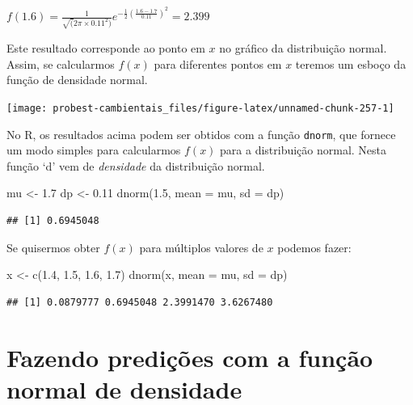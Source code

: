 \documentclass[
]{book}
\newenvironment{Shaded}{\begin{snugshade}}{\end{snugshade}}
\newcommand{\AttributeTok}[1]{\textcolor[rgb]{0.77,0.63,0.00}{#1}}
\newcommand{\FloatTok}[1]{\textcolor[rgb]{0.00,0.00,0.81}{#1}}
\newcommand{\FunctionTok}[1]{\textcolor[rgb]{0.00,0.00,0.00}{#1}}
\newcommand{\NormalTok}[1]{#1}
\newcommand{\OtherTok}[1]{\textcolor[rgb]{0.56,0.35,0.01}{#1}}
\begin{document}
\(f(1.6) = \frac{1}{\sqrt(2\pi \times0.11^2)}e^{-\frac{1}{2}(\frac{1.6 - 1.7}{0.11})^2} = 2.399\)

Este resultado corresponde ao ponto em \(x\) no gráfico da distribuição normal. Assim, se calcularmos \(f(x)\) para diferentes pontos em \(x\) teremos um esboço da função de densidade normal.

\begin{center}\texttt{[image: probest-cambientais\_files/figure-latex/unnamed-chunk-257-1]} \end{center}

No R, os resultados acima podem ser obtidos com a função \texttt{dnorm}, que fornece um modo simples para calcularmos \(f(x)\) para a distribuição normal. Nesta função `d' vem de \emph{densidade} da distribuição normal.

\begin{Shaded}
\begin{Highlighting}[]
\NormalTok{mu }\OtherTok{\textless{}{-}} \FloatTok{1.7}
\NormalTok{dp }\OtherTok{\textless{}{-}} \FloatTok{0.11}
\FunctionTok{dnorm}\NormalTok{(}\FloatTok{1.5}\NormalTok{, }\AttributeTok{mean =}\NormalTok{ mu, }\AttributeTok{sd =}\NormalTok{ dp)}
\end{Highlighting}
\end{Shaded}

\begin{verbatim}
## [1] 0.6945048
\end{verbatim}

Se quisermos obter \(f(x)\) para múltiplos valores de \(x\) podemos fazer:

\begin{Shaded}
\begin{Highlighting}[]
\NormalTok{x }\OtherTok{\textless{}{-}} \FunctionTok{c}\NormalTok{(}\FloatTok{1.4}\NormalTok{, }\FloatTok{1.5}\NormalTok{, }\FloatTok{1.6}\NormalTok{, }\FloatTok{1.7}\NormalTok{)}
\FunctionTok{dnorm}\NormalTok{(x, }\AttributeTok{mean =}\NormalTok{ mu, }\AttributeTok{sd =}\NormalTok{ dp)}
\end{Highlighting}
\end{Shaded}

\begin{verbatim}
## [1] 0.0879777 0.6945048 2.3991470 3.6267480
\end{verbatim}

\hypertarget{fazendo-prediuxe7uxf5es-com-a-funuxe7uxe3o-normal-de-densidade}{%
\section{Fazendo predições com a função normal de densidade}\label{fazendo-prediuxe7uxf5es-com-a-funuxe7uxe3o-normal-de-densidade}}
\end{document}
